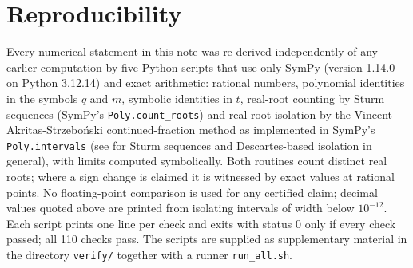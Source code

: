 \documentclass[10pt]{article}
\theoremstyle{plain}
\theoremstyle{definition}
\theoremstyle{remark}
\begin{document}
\section{Reproducibility}\label{sec:repro}

Every numerical statement in this note was re-derived independently of any earlier computation by five Python scripts that use only SymPy \cite{Meurer2017} (version 1.14.0 on Python 3.12.14) and exact arithmetic: rational numbers, polynomial identities in the symbols $q$ and $m$, symbolic identities in $t$, real-root counting by Sturm sequences (SymPy's \texttt{Poly.count\_roots}) and real-root isolation by the Vincent-Akritas-Strzebo\'nski continued-fraction method as implemented in SymPy's \texttt{Poly.intervals} \cite{AkritasStrzebonski2005} (see \cite[Chapters~2 and~10]{BasuPollackRoy2006} for Sturm sequences and Descartes-based isolation in general), with limits computed symbolically. Both routines count distinct real roots; where a sign change is claimed it is witnessed by exact values at rational points. No floating-point comparison is used for any certified claim; decimal values quoted above are printed from isolating intervals of width below $10^{-12}$. Each script prints one line per check and exits with status $0$ only if every check passed; all 110 checks pass. The scripts are supplied as supplementary material in the directory \texttt{verify/} together with a runner \texttt{run\_all.sh}.
\end{document}
